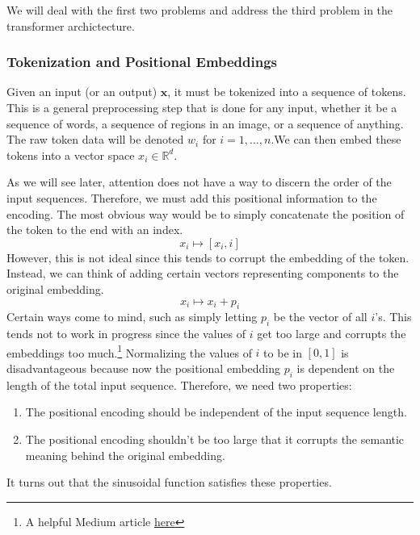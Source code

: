 \documentclass{article}
\begin{document}
      We will deal with the first two problems and address the third problem in the transformer archictecture. 

    \subsubsection{Tokenization and Positional Embeddings}

      Given an input (or an output) $\mathbf{x}$, it must be tokenized into a sequence of tokens. This is a general preprocessing step that is done for any input, whether it be a sequence of words, a sequence of regions in an image, or a sequence of anything. The raw token data will be denoted $w_i$ for $i = 1, \ldots, n$.We can then embed these tokens into a vector space $x_i \in \mathbb{R}^d$. 

      As we will see later, attention does not have a way to discern the order of the input sequences. Therefore, we must add this positional information to the encoding. The most obvious way would be to simply concatenate the position of the token to the end with an index. 
      \begin{equation} 
        x_i \mapsto [x_i, i]
      \end{equation}
      However, this is not ideal since this tends to corrupt the embedding of the token. Instead, we can think of adding certain vectors representing components to the original embedding. 
      \begin{equation} 
        x_i \mapsto x_i + p_i
      \end{equation}
      Certain ways come to mind, such as simply letting $p_i$ be the vector of all $i$'s. This tends not to work in progress since the values of $i$ get too large and corrupts the embeddings too much.\footnote{A helpful Medium article \href{https://medium.com/@waelrashwan/demystifying-transformer-architecture-the-magic-of-positional-encoding-5fe8154d4a64}{here}} Normalizing the values of $i$ to be in $[0, 1]$ is disadvantageous because now the positional embedding $p_i$ is dependent on the length of the total input sequence. Therefore, we need two properties: 
      \begin{enumerate} 
        \item The positional encoding should be independent of the input sequence length. 
        \item The positional encoding shouldn't be too large that it corrupts the semantic meaning behind the original embedding. 
      \end{enumerate}
      It turns out that the sinusoidal function satisfies these properties. 
\end{document}
